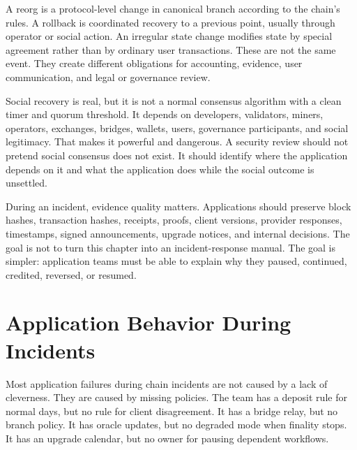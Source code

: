 A reorg is a protocol-level change in canonical branch according to the chain's rules. A rollback is coordinated recovery to a previous point, usually through operator or social action. An irregular state change modifies state by special agreement rather than by ordinary user transactions. These are not the same event. They create different obligations for accounting, evidence, user communication, and legal or governance review.

Social recovery is real, but it is not a normal consensus algorithm with a clean timer and quorum threshold. It depends on developers, validators, miners, operators, exchanges, bridges, wallets, users, governance participants, and social legitimacy. That makes it powerful and dangerous. A security review should not pretend social consensus does not exist. It should identify where the application depends on it and what the application does while the social outcome is unsettled.

During an incident, evidence quality matters. Applications should preserve block hashes, transaction hashes, receipts, proofs, client versions, provider responses, timestamps, signed announcements, upgrade notices, and internal decisions. The goal is not to turn this chapter into an incident-response manual. The goal is simpler: application teams must be able to explain why they paused, continued, credited, reversed, or resumed.

\section{Application Behavior During Incidents}

Most application failures during chain incidents are not caused by a lack of cleverness. They are caused by missing policies. The team has a deposit rule for normal days, but no rule for client disagreement. It has a bridge relay, but no branch policy. It has oracle updates, but no degraded mode when finality stops. It has an upgrade calendar, but no owner for pausing dependent workflows.

